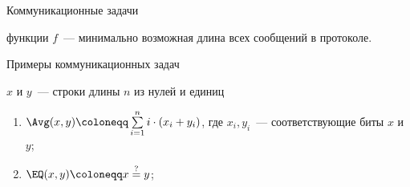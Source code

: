 \begin{frame}{Коммуникационные задачи}

    \begin{center}
    	    
    \end{center}

    \pause
    \pause
    \pause
	\pause

     функции $f$~--- минимально возможная длина всех сообщений в
    протоколе.
\end{frame}


\begin{frame}{Примеры коммуникационных задач}
    
    $x$ и $y$~--- строки длины $n$ из нулей и единиц
            
    \begin{overlayarea}{\textwidth}{10cm}
        \begin{enumerate}
            \item $\Avg(x, y) \coloneqq \sum\limits_{i = 1}^{n} i \cdot (x_i + y_i)$, где
                $x_i, y_i$~--- соответствующие биты $x$ и $y$;

        \pause

        \pause
            \item $\EQ(x, y) \coloneqq x \stackrel{?}{=} y$;



\end{enumerate}
\end{overlayarea}
\end{frame}
